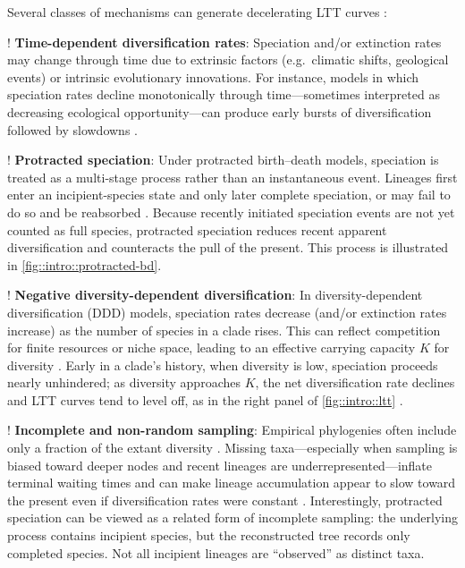 Several classes of mechanisms can generate decelerating LTT curves \citep{moen_why_2014,stadler_decoding_2024}:

\begin{fancyenumerate}
    \item! \textbf{Time-dependent diversification rates}: Speciation and/or extinction rates may change through time due to extrinsic factors (e.g.\ climatic shifts, geological events) or intrinsic evolutionary innovations. For instance, models in which speciation rates decline monotonically through time---sometimes interpreted as decreasing ecological opportunity---can produce early bursts of diversification followed by slowdowns \citep{moen_why_2014,morlon_reconciling_2011,stadler_inferring_2011}.
    \item! \textbf{Protracted speciation}: Under protracted birth--death models, speciation is treated as a multi-stage process rather than an instantaneous event. Lineages first enter an incipient-species state and only later complete speciation, or may fail to do so and be reabsorbed \citep{etienne_prolonging_2012,rosindell_protracted_2010}. Because recently initiated speciation events are not yet counted as full species, protracted speciation reduces recent apparent diversification and counteracts the pull of the present. This process is illustrated in \autoref{fig::intro::protracted-bd}.
    \item! \textbf{Negative diversity-dependent diversification}: In diversity-dependent diversification (DDD) models, speciation rates decrease (and/or extinction rates increase) as the number of species in a clade rises. This can reflect competition for finite resources or niche space, leading to an effective carrying capacity $K$ for diversity \citep{valentine_evolutionary_1974,sepkoski_kinetic_1978,etienne_diversity-dependence_2012}. Early in a clade's history, when diversity is low, speciation proceeds nearly unhindered; as diversity approaches $K$, the net diversification rate declines and LTT curves tend to level off, as in the right panel of \autoref{fig::intro::ltt} \citep{wiens_causes_2011}.
    \item! \textbf{Incomplete and non-random sampling}: Empirical phylogenies often include only a fraction of the extant diversity \citep{pybus_testing_2000, cusimano_slowdowns_2010, hohna_inferring_2011}. Missing taxa---especially when sampling is biased toward deeper nodes and recent lineages are underrepresented---inflate terminal waiting times and can make lineage accumulation appear to slow toward the present even if diversification rates were constant \citep{cusimano_slowdowns_2010}. Interestingly, protracted speciation can be viewed as a related form of incomplete sampling: the underlying process contains incipient species, but the reconstructed tree records only completed species. Not all incipient lineages are ``observed'' as distinct taxa.
\end{fancyenumerate}

